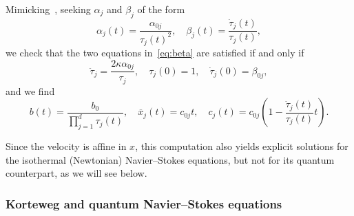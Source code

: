 \documentclass[AHL,Unicode,longabstracts]{cedram}
\newcommand*\<{\left\langle}
\renewcommand*\>{\right\rangle}
\begin{document}
Mimicking~\cite{LiWa06}, seeking $\alpha_j$ and $\beta_j$ of the form
\begin{equation*}
\alpha_j(t) =\frac{\alpha_{0j}}{\tau_j(t)^2},\quad \beta_j(t) =
\frac{\dot \tau_j(t)}{\tau_j(t)},
\end{equation*}
we check that the two equations in~\eqref{eq:beta} are satisfied if and only if
\begin{equation}\label{eq:tauj}
\ddot \tau_j =
\frac{2\kappa \alpha_{0j}}{\tau_j},\quad
\tau_j(0)=1,\quad \dot \tau_j(0)=\beta_{0j},
\end{equation}
and we find
\begin{equation*}
b(t)=\frac{b_0}{\prod_{j=1}^d \tau_j(t)},\quad
\overline x_j(t)= c_{0j}t,\quad c_j(t) =c_{0j}\left(1-\frac{\dot
\tau_j(t)}{\tau_j(t)}t\right).
\end{equation*}
\begin{rema}
Since the velocity is affine in $x$, this computation also yields explicit solutions for the isothermal (Newtonian) Navier--Stokes equations, but not for its quantum counterpart, as we will see below.
\end{rema}

\subsubsection{Korteweg and quantum Navier--Stokes equations}
\end{document}
